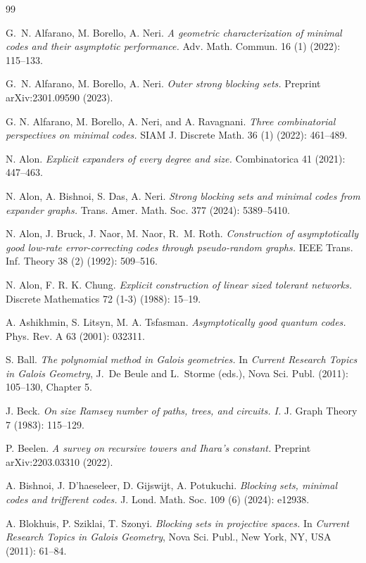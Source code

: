 \documentclass[11pt]{article}
\theoremstyle{plain}
\theoremstyle{definition}
\begin{document}
\begin{thebibliography}{99}

G.~N. Alfarano, M. Borello, A. Neri.
\emph{A geometric characterization of minimal codes and their asymptotic performance.}
Adv. Math. Commun. 16 (1) (2022): 115--133.

G.~N. Alfarano, M. Borello, A. Neri.
\emph{Outer strong blocking sets.}
Preprint arXiv:2301.09590 (2023).

G. N. Alfarano, M. Borello, A. Neri, and A. Ravagnani.
\emph{Three combinatorial perspectives on minimal codes.}
SIAM J. Discrete Math. 36 (1) (2022): 461--489.

N. Alon.
\emph{Explicit expanders of every degree and size.}
Combinatorica 41 (2021): 447--463.

N. Alon, A. Bishnoi, S. Das, A. Neri.
\emph{Strong blocking sets and minimal codes from expander graphs.}
Trans. Amer. Math. Soc. 377 (2024): 5389--5410.

N. Alon, J. Bruck, J. Naor, M. Naor, R.~M. Roth.
\emph{Construction of asymptotically good low-rate error-correcting codes through pseudo-random graphs.}
IEEE Trans. Inf. Theory 38 (2) (1992): 509--516.

N. Alon, F. R. K. Chung. 
\emph{Explicit construction of linear sized tolerant networks.}
Discrete Mathematics 72 (1-3) (1988): 15--19.

A. Ashikhmin, S. Litsyn, M. A. Tsfasman.
\emph{Asymptotically good quantum codes.}
Phys. Rev. A 63 (2001): 032311.

S. Ball.
\emph{The polynomial method in Galois geometries.}
In \emph{Current Research Topics in Galois Geometry}, J.~De Beule and L.~Storme (eds.), Nova Sci. Publ. (2011): 105--130, Chapter 5.

J. Beck.
\emph{On size Ramsey number of paths, trees, and circuits. I.}
J. Graph Theory 7 (1983): 115--129.

P. Beelen.
\emph{A survey on recursive towers and Ihara's constant.}
Preprint arXiv:2203.03310 (2022).

A. Bishnoi, J. D'haeseleer, D. Gijswijt, A. Potukuchi.
\emph{Blocking sets, minimal codes and trifferent codes.}
J. Lond. Math. Soc. 109 (6) (2024): e12938.

A. Blokhuis, P. Sziklai, T. Szonyi.
\emph{Blocking sets in projective spaces.}
In \emph{Current Research Topics in Galois Geometry}, Nova Sci. Publ., New York, NY, USA (2011): 61--84.


\end{thebibliography}
\end{document}
